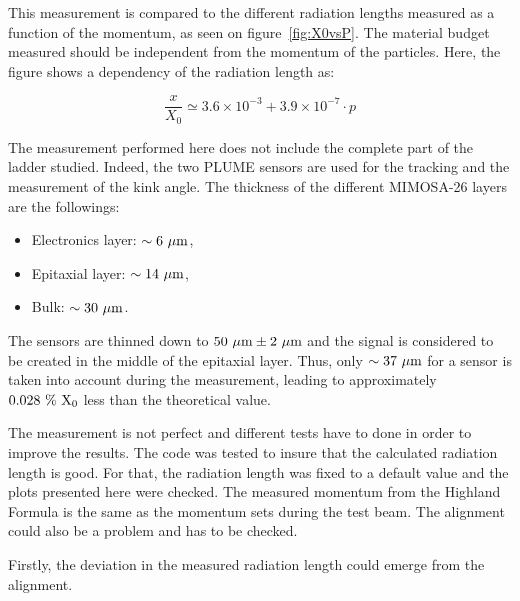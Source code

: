    This measurement is compared to the different radiation lengths measured as a function of the momentum, as seen on figure~\ref{fig:X0vsP}.
   The material budget measured should be independent from the momentum of the particles.
   Here, the figure shows a dependency of the radiation length as: 

   \begin{equation}
     \frac{x}{X_0} \simeq 3.6 \times 10^{-3} + 3.9 \times 10^{-7}\cdot p
   \end{equation}

   The measurement performed here does not include the complete part of the ladder studied.
   Indeed, the two \gls{PLUME} sensors are used for the tracking and the measurement of the kink angle.
   The thickness of the different \gls{MIMOSA}-26 layers are the followings: 
   \begin{itemize}
     \item Electronics layer: $\sim 6~\rm{\mu m}$,
     \item Epitaxial layer: $\sim 14~\rm{\mu m}$,
     \item Bulk: $\sim 30~\rm{\mu m}$.
   \end{itemize}
   The sensors are thinned down to $50~\rm{\mu m} \pm 2~\rm{\mu m}$ and the signal is considered to be created in the middle of the epitaxial layer. 
   Thus, only $\sim 37~\rm{\mu m}$ for a sensor is taken into account during the measurement, leading to approximately $0.028~\%~\rm{X_{0}}$ less than the theoretical value.
    

   The measurement is not perfect and different tests have to done in order to improve the results.
   The code was tested to insure that the calculated radiation length is good.
   For that, the radiation length was fixed to a default value and the plots presented here were checked.
   The measured momentum from the Highland Formula is the same as the momentum sets during the test beam.
   The alignment could also be a problem and has to be checked.


   Firstly, the deviation in the measured radiation length could emerge from the alignment.
  

